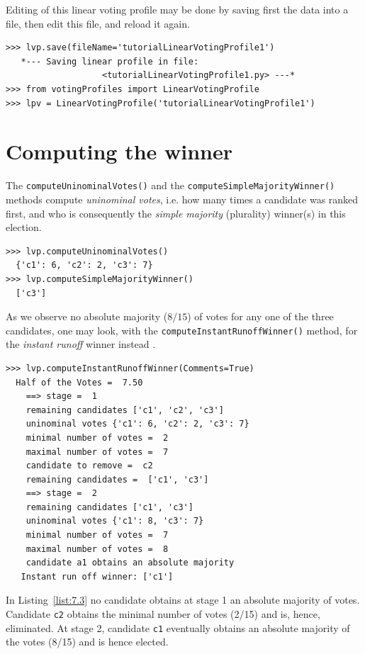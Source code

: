 Editing of this linear voting profile may be done by saving first the data into a file, then edit this file, and reload it again.
\begin{lstlisting}
>>> lvp.save(fileName='tutorialLinearVotingProfile1')
   *--- Saving linear profile in file:
                   <tutorialLinearVotingProfile1.py> ---*
>>> from votingProfiles import LinearVotingProfile
>>> lpv = LinearVotingProfile('tutorialLinearVotingProfile1')
\end{lstlisting}

\section{Computing the winner}
\label{sec:7.2}

The \texttt{computeUninominalVotes()} and the \texttt{computeSimpleMajority\-Winner()} methods compute \emph{uninominal votes}, i.e. how many times a candidate was ranked first, and who is consequently the \emph{simple majority} (plurality) winner(s) in this election.
\begin{lstlisting}
>>> lvp.computeUninominalVotes()
  {'c1': 6, 'c2': 2, 'c3': 7}
>>> lvp.computeSimpleMajorityWinner()
  ['c3']
\end{lstlisting}

As we observe no absolute majority ($8/15$) of votes for any one of the three candidates, one may look, with the \texttt{computeInstantRunoffWinner()} method, for the \emph{instant runoff} winner instead \citep{ADT-L2}.
\begin{lstlisting}[caption={Example Instant Run Off Winner},label=list:7.3]
>>> lvp.computeInstantRunoffWinner(Comments=True)
  Half of the Votes =  7.50
    ==> stage =  1
	remaining candidates ['c1', 'c2', 'c3']
	uninominal votes {'c1': 6, 'c2': 2, 'c3': 7}
	minimal number of votes =  2
	maximal number of votes =  7
	candidate to remove =  c2
	remaining candidates =  ['c1', 'c3']
    ==> stage =  2
	remaining candidates ['c1', 'c3']
	uninominal votes {'c1': 8, 'c3': 7}
	minimal number of votes =  7
	maximal number of votes =  8
	candidate a1 obtains an absolute majority
   Instant run off winner: ['c1']
 \end{lstlisting}

In Listing~\vref{list:7.3} no candidate obtains at stage 1 an absolute majority of votes. Candidate \texttt{c2} obtains the minimal number of votes (2/15) and is, hence, eliminated. At stage 2, candidate \texttt{c1} eventually obtains an absolute majority of the votes (8/15) and is hence elected.

